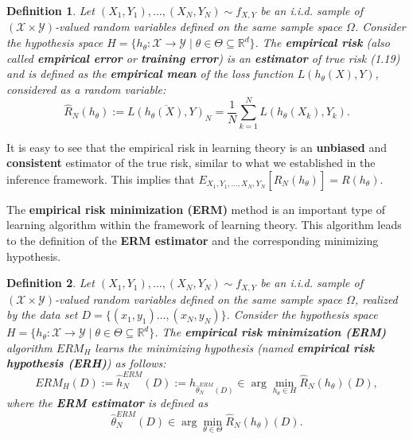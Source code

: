 \documentclass{report}
\newtheorem{definition}{Definition}[chapter]
\begin{document}
\begin{definition}
Let $(X_1, Y_1),\dots,(X_N, Y_N) \sim f_{X,Y}$ be an i.i.d. sample of $(\mathcal{X} \times \mathcal{Y})$-valued random variables defined on the same sample space $\Omega$. Consider the hypothesis space $H=\{h_\theta : \mathcal{X} \to \mathcal{Y} \mid\theta\in\Theta\subseteq\mathbb{R}^d\}$. The \textbf{empirical risk} (also called \textbf{empirical error} or \textbf{training error}) is an \textbf{estimator} of true risk (1.19) and is defined as the \textbf{empirical mean} of the loss function $L(h_\theta(X), Y)$, considered as a random variable:
\begin{equation}
\hat{R}_N(h_\theta) := \overline{L(h_\theta(X),Y)}_N = \frac{1}{N}\sum_{k=1}^{N}L(h_\theta(X_k),Y_k).
\end{equation}
\end{definition}

It is easy to see that the empirical risk in learning theory is an \textbf{unbiased} and \textbf{consistent} estimator of the true risk, similar to what we established in the inference framework. This implies that $E_{X_1,Y_1,\dots,X_N,Y_N}[\hat{R}_N(h_\theta)] =  R(h_\theta)$.

The \textbf{empirical risk minimization (ERM)} method is an important type of learning algorithm within the framework of learning theory. This algorithm leads to the definition of the \textbf{ERM estimator} and the corresponding minimizing hypothesis.

\begin{definition}
Let $(X_1, Y_1),\dots,(X_N, Y_N) \sim f_{X,Y}$ be an i.i.d. sample of $(\mathcal{X} \times \mathcal{Y})$-valued random variables defined on the same sample space $\Omega$, realized by the data set $D =\{(x_1, y_1)\dots,(x_N,y_N)\}$. Consider the hypothesis space $H = \{h_\theta : \mathcal{X} \to \mathcal{Y} \mid\theta\in\Theta\subseteq\mathbb{R}^d\}$. The \textbf{empirical risk minimization (ERM)} algorithm $ERM_H$ learns the minimizing hypothesis (named \textbf{empirical risk hypothesis (ERH)}) as follows:
\begin{equation}
ERM_H(D) := \hat{h}_N^{ERM}(D) := h_{\hat{\theta}^{ERM}_N(D)} \in \arg \min_{h_\theta \in H} \hat{R}_N(h_\theta)(D),
\end{equation}
where the \textbf{ERM estimator} is defined as
\begin{equation}
\hat{\theta}^{ERM}_N(D) \in \arg\min_{\theta \in \Theta}\hat{R}_N(h_\theta)(D).
\end{equation}
\end{definition}
\end{document}
